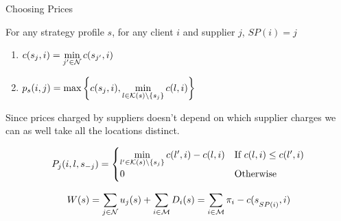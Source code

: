 \documentclass[aspectratio=1610]{beamer}
\begin{document}
\begin{frame}{Choosing Prices}

\begin{theorem}
    For any strategy profile $s$, for any client $i$ and supplier $j$,  $SP(i)=j$ \begin{enumerate}[label=(\roman*)]
        \item $c(s_j,i)=\min\limits_{j'\in\mathcal{N}}c(s_{j'},i)$
        \item $p_s(i,j)=\max\left\{ c(s_j,i),\min\limits_{l\in \mathcal{K}(s)\setminus\{s_j\}}c(l,i)\right\}$
    \end{enumerate}
\end{theorem}\pause

Since prices charged by suppliers doesn't depend on which supplier charges we can as well take all the locations distinct.\pause

$$P_j(i,l,s_{-j})=\begin{cases}
    \min\limits_{l'\in \mathcal{K}(s)\setminus \{s_j\}}c(l',i)- c(l,i) & \text{If $c(l,i)\leq c(l',i)$}\\
    0 & \text{Otherwise}
\end{cases}$$\pause

$$W(s)=\sum\limits_{j\in\mathcal{N}}u_j(s)+\sum\limits_{i\in\mathcal{M}}D_i(s)=\sum\limits_{i\in\mathcal{M}}\pi_i-c(s\strut_{SP(i)},i)$$
\end{frame}
\end{document}
